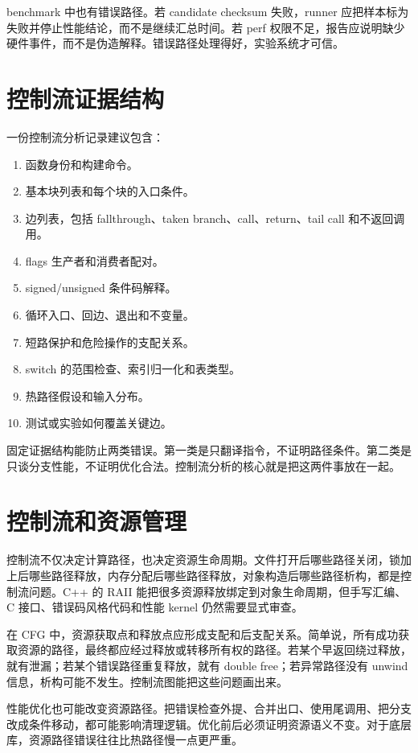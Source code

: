 benchmark 中也有错误路径。若 candidate checksum 失败，runner 应把样本标为失败并停止性能结论，而不是继续汇总时间。若 perf 权限不足，报告应说明缺少硬件事件，而不是伪造解释。错误路径处理得好，实验系统才可信。

\section{控制流证据结构}

一份控制流分析记录建议包含：

\begin{enumerate}
  \item 函数身份和构建命令。
  \item 基本块列表和每个块的入口条件。
  \item 边列表，包括 fallthrough、taken branch、call、return、tail call 和不返回调用。
  \item flags 生产者和消费者配对。
  \item signed/unsigned 条件码解释。
  \item 循环入口、回边、退出和不变量。
  \item 短路保护和危险操作的支配关系。
  \item switch 的范围检查、索引归一化和表类型。
  \item 热路径假设和输入分布。
  \item 测试或实验如何覆盖关键边。
\end{enumerate}

固定证据结构能防止两类错误。第一类是只翻译指令，不证明路径条件。第二类是只谈分支性能，不证明优化合法。控制流分析的核心就是把这两件事放在一起。

\section{控制流和资源管理}

控制流不仅决定计算路径，也决定资源生命周期。文件打开后哪些路径关闭，锁加上后哪些路径释放，内存分配后哪些路径释放，对象构造后哪些路径析构，都是控制流问题。C++ 的 RAII 能把很多资源释放绑定到对象生命周期，但手写汇编、C 接口、错误码风格代码和性能 kernel 仍然需要显式审查。

在 CFG 中，资源获取点和释放点应形成支配和后支配关系。简单说，所有成功获取资源的路径，最终都应经过释放或转移所有权的路径。若某个早返回绕过释放，就有泄漏；若某个错误路径重复释放，就有 double free；若异常路径没有 unwind 信息，析构可能不发生。控制流图能把这些问题画出来。

性能优化也可能改变资源路径。把错误检查外提、合并出口、使用尾调用、把分支改成条件移动，都可能影响清理逻辑。优化前后必须证明资源语义不变。对于底层库，资源路径错误往往比热路径慢一点更严重。

